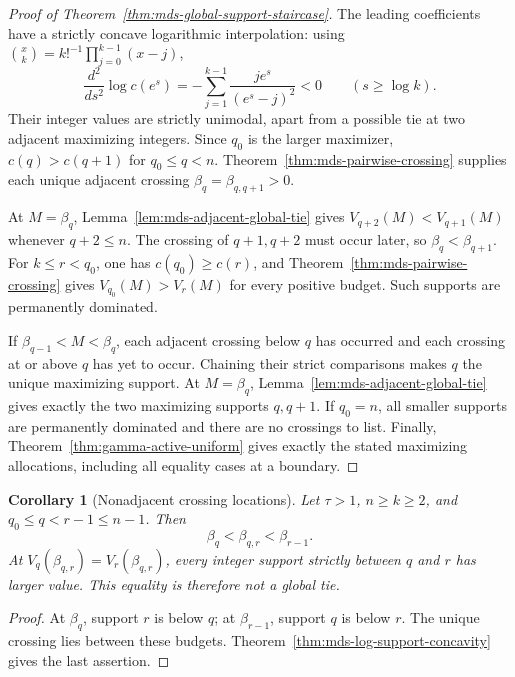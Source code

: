 \documentclass[11pt]{article}
\newtheorem{corollary}[theorem]{Corollary}
\theoremstyle{definition}
\theoremstyle{remark}
\newcommand{\1}{\mathbf 1}
\begin{document}
\begin{proof}[Proof of Theorem~\ref{thm:mds-global-support-staircase}]
The leading coefficients have a strictly concave logarithmic
interpolation: using \(\binom{x}{k}=k!^{-1}\prod_{j=0}^{k-1}(x-j)\),
\[
 \frac{d^2}{ds^2}\log c(e^s)
 =-\sum_{j=1}^{k-1}\frac{je^s}{(e^s-j)^2}<0
 \qquad(s\ge\log k).
\]
Their integer values are strictly unimodal, apart from a possible
tie at two adjacent maximizing integers. Since \(q_0\) is the larger
maximizer, \(c(q)>c(q+1)\) for \(q_0\le q<n\).
Theorem~\ref{thm:mds-pairwise-crossing} supplies each unique adjacent
crossing \(\beta_q=\beta_{q,q+1}>0\).

At \(M=\beta_q\), Lemma~\ref{lem:mds-adjacent-global-tie} gives
\(V_{q+2}(M)<V_{q+1}(M)\) whenever \(q+2\le n\).
The crossing of \(q+1,q+2\) must occur later, so
\(\beta_q<\beta_{q+1}\).
For \(k\le r<q_0\), one has \(c(q_0)\ge c(r)\), and
Theorem~\ref{thm:mds-pairwise-crossing} gives
\(V_{q_0}(M)>V_r(M)\) for every positive budget. Such supports
are permanently dominated.

If \(\beta_{q-1}<M<\beta_q\), each adjacent crossing below \(q\)
has occurred and each crossing at or above \(q\) has yet to occur.
Chaining their strict comparisons makes \(q\) the unique maximizing
support. At \(M=\beta_q\), Lemma~\ref{lem:mds-adjacent-global-tie}
gives exactly the two maximizing supports \(q,q+1\).
If \(q_0=n\), all smaller supports are permanently dominated and
there are no crossings to list. Finally,
Theorem~\ref{thm:gamma-active-uniform} gives exactly the stated
maximizing allocations, including all equality cases at a boundary.
\end{proof}

\begin{corollary}[Nonadjacent crossing locations]
\label{cor:mds-nonadjacent-crossing-location}
Let \(\tau>1\), \(n\ge k\ge2\), and
\(q_0\le q<r-1\le n-1\). Then
\[
 \beta_q<\beta_{q,r}<\beta_{r-1}.
\]
At \(V_q(\beta_{q,r})=V_r(\beta_{q,r})\), every integer support
strictly between \(q\) and \(r\) has larger value. This equality is
therefore not a global tie.
\end{corollary}
\begin{proof}
At \(\beta_q\), support \(r\) is below \(q\); at
\(\beta_{r-1}\), support \(q\) is below \(r\).
The unique crossing lies between these budgets.
Theorem~\ref{thm:mds-log-support-concavity} gives the last assertion.
\end{proof}
\end{document}
